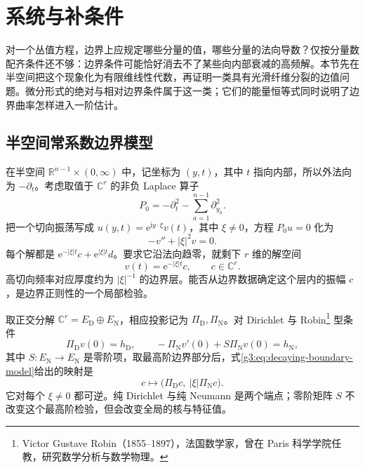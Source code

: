 
% 
% 

\section{系统与补条件}
\label{g3:sec:1403}

对一个丛值方程，边界上应规定哪些分量的值，哪些分量的法向导数？仅按分量数配齐条件还不够：边界条件可能恰好消去不了某些向内部衰减的高频解。本节先在半空间把这个现象化为有限维线性代数，再证明一类具有光滑纤维分裂的边值问题。微分形式的绝对与相对边界条件属于这一类；它们的能量恒等式同时说明了边界曲率怎样进入一阶估计。

\subsection{半空间常系数边界模型}
\label{g3:subsec:1403:01}
在半空间 \(\mathbb R^{n-1}\times(0,\infty)\) 中，记坐标为 \((y,t)\)，其中 \(t\) 指向内部，所以外法向为 \(-\partial_t\)。考虑取值于 \(\mathbb C^r\) 的非负 Laplace 算子
\[
	P_0=-\partial_t^2-\sum_{a=1}^{n-1}\partial_{y_a}^2.
\]
把一个切向振荡写成 \(u(y,t)=\mathrm e^{\mathrm i y\cdot\xi}v(t)\)，其中 \(\xi\ne0\)，方程 \(P_0u=0\) 化为
\[
	-v''+|\xi|^2v=0.
\]
每个解都是 \(\mathrm e^{-|\xi|t}c+\mathrm e^{|\xi|t}d\)。要求它沿法向趋零，就剩下 \(r\) 维的解空间
\begin{equation}\label{g3:eq:decaying-boundary-model}
	v(t)=\mathrm e^{-|\xi|t}c,\qquad c\in\mathbb C^r.
\end{equation}
高切向频率对应厚度约为 \(|\xi|^{-1}\) 的边界层。能否从边界数据确定这个层内的振幅 \(c\)，是边界正则性的一个局部检验。

\begin{example}\label{g3:exm:boundary-dirichlet-robin-symbol}
	取正交分解 \(\mathbb C^r=E_{\mathrm D}\oplus E_{\mathrm N}\)，相应投影记为 \(\Pi_{\mathrm D},\Pi_{\mathrm N}\)。对 Dirichlet 与 Robin\footnote{Victor Gustave Robin（1855--1897），法国数学家，曾在 Paris 科学学院任教，研究数学分析与数学物理。} 型条件
	\[
		\Pi_{\mathrm D}v(0)=h_{\mathrm D},\qquad
		-\Pi_{\mathrm N}v'(0)+S\Pi_{\mathrm N}v(0)=h_{\mathrm N},
	\]
	其中 \(S:E_{\mathrm N}\to E_{\mathrm N}\) 是零阶项，取最高阶边界部分后，式\eqref{g3:eq:decaying-boundary-model}给出的映射是
	\[
		c\longmapsto\bigl(\Pi_{\mathrm D}c,\ |\xi|\Pi_{\mathrm N}c\bigr).
	\]
	它对每个 \(\xi\ne0\) 都可逆。纯 Dirichlet 与纯 Neumann 是两个端点；零阶矩阵 \(S\) 不改变这个最高阶检验，但会改变全局的核与特征值。
\end{example}

